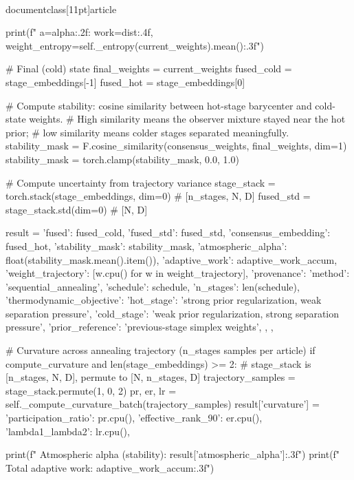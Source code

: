 \\documentclass[11pt]{article}
\begin{document}
\begin{CodeBlock}
{{{{{{{{            print(f"  a={alpha:.2f}: work={dist:.4f}, weight_entropy={self._entropy(current_weights).mean():.3f}")

        # Final (cold) state
        final_weights = current_weights
        fused_cold = stage_embeddings[-1]
        fused_hot = stage_embeddings[0]

        # Compute stability: cosine similarity between hot-stage barycenter and cold-state weights.
        # High similarity means the observer mixture stayed near the hot prior;
        # low similarity means colder stages separated meaningfully.
        stability_mask = F.cosine_similarity(consensus_weights, final_weights, dim=1)
        stability_mask = torch.clamp(stability_mask, 0.0, 1.0)

        # Compute uncertainty from trajectory variance
        stage_stack = torch.stack(stage_embeddings, dim=0)  # [n_stages, N, D]
        fused_std = stage_stack.std(dim=0)  # [N, D]

        result = {
            'fused': fused_cold,
            'fused_std': fused_std,
            'consensus_embedding': fused_hot,
            'stability_mask': stability_mask,
            'atmospheric_alpha': float(stability_mask.mean().item()),
            'adaptive_work': adaptive_work_accum,
            'weight_trajectory': [w.cpu() for w in weight_trajectory],
            'provenance': {
                'method': 'sequential_annealing',
                'schedule': schedule,
                'n_stages': len(schedule),
                'thermodynamic_objective': {
                    'hot_stage': 'strong prior regularization, weak separation pressure',
                    'cold_stage': 'weak prior regularization, strong separation pressure',
                    'prior_reference': 'previous-stage simplex weights',
                },
            },
        }

        # Curvature across annealing trajectory (n_stages samples per article)
        if compute_curvature and len(stage_embeddings) >= 2:
            # stage_stack is [n_stages, N, D], permute to [N, n_stages, D]
            trajectory_samples = stage_stack.permute(1, 0, 2)
            pr, er, lr = self._compute_curvature_batch(trajectory_samples)
            result['curvature'] = {
                'participation_ratio': pr.cpu(),
                'effective_rank_90': er.cpu(),
                'lambda1_lambda2': lr.cpu(),
            }

        print(f"  Atmospheric alpha (stability): {result['atmospheric_alpha']:.3f}")
        print(f"  Total adaptive work: {adaptive_work_accum:.3f}")

}}}}}}}}
\end{CodeBlock}
\end{document}
